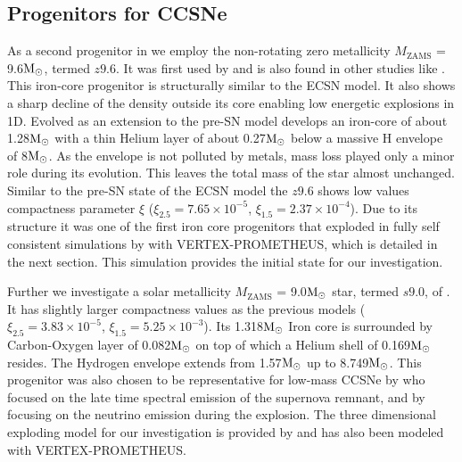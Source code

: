 \documentclass[fleqn,usenatbib]{mnras}
\newcommand{\solm}{\xspace\ensuremath{\rm{M_{\odot}}}\xspace}
\newcommand{\vertexprom}{\textsc{V{\footnotesize ERTEX}-P{\footnotesize ROMETHEUS}}\xspace}
\begin{document}
\subsection{Progenitors for CCSNe}
As a second progenitor in we employ the non-rotating zero metallicity $M_{\text{ZAMS}}$ = 9.6\solm, termed $z9.6$. It was first used by \citet{Janka2012} and is also found in other studies like \citet{Mueller2013,Mueller2018}. This iron-core progenitor is structurally similar to the ECSN model. It also shows a sharp decline of the density outside its core enabling low energetic explosions in 1D. 
Evolved as an extension to \cite{Heger2010} the pre-SN model develops an iron-core of about 1.28\solm with a thin Helium layer of about 0.27\solm below a massive H envelope of 8\solm. As the envelope is not polluted by metals, mass loss played only a minor role during its evolution. This leaves the total mass of the star almost unchanged. Similar to the pre-SN state of the ECSN model the $z9.6$ shows low values compactness  parameter $\xi$ ($\xi_{2.5}= 7.65 \times 10^{-5}$, $\xi_{1.5}= 2.37 \times 10^{-4}$). 
Due to its structure it was one of the first iron core progenitors that exploded in fully self consistent simulations by \cite{Melson2015a} with \vertexprom, which is detailed in the next section. This simulation provides the initial state for our investigation. 

Further we investigate a solar metallicity $M_{\text{ZAMS}}$ = 9.0\solm star, termed $s9.0$, of \citet{Sukhbold2016}. It has slightly larger compactness values as the previous models ($\xi_{2.5}= 3.83 \times 10^{-5}$, $\xi_{1.5}= 5.25 \times 10^{-3}$). Its 1.318\solm Iron core is surrounded by Carbon-Oxygen layer of 0.082\solm on top of which a Helium shell of 0.169\solm resides. The Hydrogen envelope extends from 1.57\solm up to 8.749\solm.
This progenitor was also chosen to be representative for low-mass CCSNe by \cite{Jerkstrand2018} who focused on the late time spectral emission of the supernova remnant, and by \cite{Glas2019} focusing on the neutrino emission during the explosion. The three dimensional exploding model for our investigation is provided by \citet{Melson2019} and has also been modeled with \vertexprom. 
\end{document}
